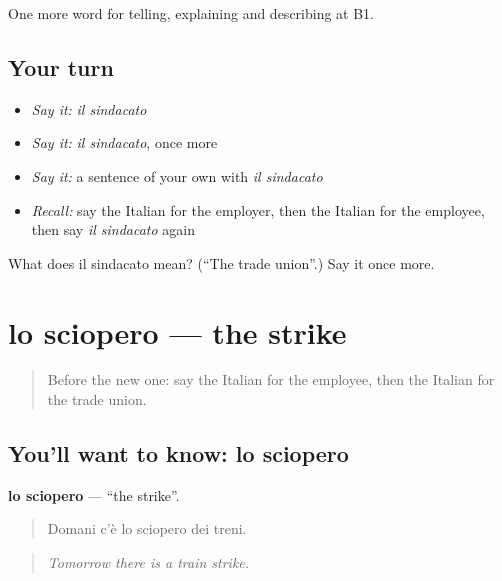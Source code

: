 \begin{grammarlens}[title={What you've built}]
One more word for telling, explaining and describing at B1.
\end{grammarlens}

\subsection*{Your turn}
\begin{itemize}
\raggedright
  \item \emph{Say it:} \emph{il sindacato}
  \item \emph{Say it:} \emph{il sindacato}, once more
  \item \emph{Say it:} a sentence of your own with \emph{il sindacato}
  \item \emph{Recall:} say the Italian for the employer, then the Italian for the employee, then say \emph{il sindacato} again
\end{itemize}

\begin{tcolorbox}[breakable,colback=teal!4,colframe=teal!35!black,title={Before you move on}]
What does il sindacato mean? (\textquotedblleft{}The trade union\textquotedblright{}.) Say it once more.
\end{tcolorbox}
\section[lo sciopero]{lo sciopero — the strike}

\label{lesson:IT-C359-sciopero}



\begin{quote}
Before the new one: say the Italian for the employee, then the Italian for the trade union.
\end{quote}

\subsection*{You'll want to know: lo sciopero}
\textbf{lo sciopero} — \textquotedblleft{}the strike\textquotedblright{}.

\begin{quote}
Domani c'è lo sciopero dei treni.
\end{quote}

\begin{quote}
\emph{Tomorrow there is a train strike.}
\end{quote}


